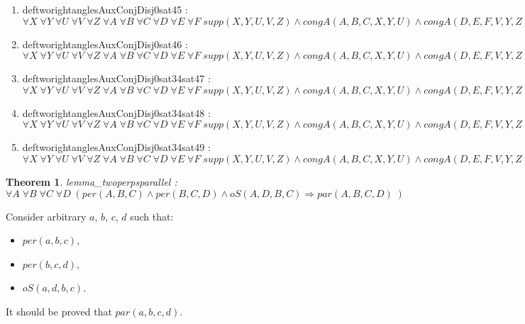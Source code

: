 \documentclass{article}
\newtheorem{theorem}{Theorem}
\begin{document}
\begin{enumerate}
\item deftworightanglesAuxConjDisj0sat45 : $\forall X\;\forall Y\;\forall U\;\forall V\;\forall Z\;\forall A\;\forall B\;\forall C\;\forall D\;\forall E\;\forall F\;supp(X, Y, U, V, Z)\wedge congA(A, B, C, X, Y, U)\wedge congA(D, E, F, V, Y, Z) \Rightarrow X \neq Y)$
\item deftworightanglesAuxConjDisj0sat46 : $\forall X\;\forall Y\;\forall U\;\forall V\;\forall Z\;\forall A\;\forall B\;\forall C\;\forall D\;\forall E\;\forall F\;supp(X, Y, U, V, Z)\wedge congA(A, B, C, X, Y, U)\wedge congA(D, E, F, V, Y, Z) \Rightarrow Y \neq Z)$
\item deftworightanglesAuxConjDisj0sat34sat47 : $\forall X\;\forall Y\;\forall U\;\forall V\;\forall Z\;\forall A\;\forall B\;\forall C\;\forall D\;\forall E\;\forall F\;supp(X, Y, U, V, Z)\wedge congA(A, B, C, X, Y, U)\wedge congA(D, E, F, V, Y, Z) \Rightarrow Z \neq X)$
\item deftworightanglesAuxConjDisj0sat34sat48 : $\forall X\;\forall Y\;\forall U\;\forall V\;\forall Z\;\forall A\;\forall B\;\forall C\;\forall D\;\forall E\;\forall F\;supp(X, Y, U, V, Z)\wedge congA(A, B, C, X, Y, U)\wedge congA(D, E, F, V, Y, Z) \Rightarrow Y \neq X)$
\item deftworightanglesAuxConjDisj0sat34sat49 : $\forall X\;\forall Y\;\forall U\;\forall V\;\forall Z\;\forall A\;\forall B\;\forall C\;\forall D\;\forall E\;\forall F\;supp(X, Y, U, V, Z)\wedge congA(A, B, C, X, Y, U)\wedge congA(D, E, F, V, Y, Z) \Rightarrow Z \neq Y)$
\end{enumerate}

\hrulefill

\begin{theorem}
lemma\_twoperpsparallel : $\forall A \; \forall B \; \forall C \; \forall D \; ( per(A, B, C)\wedge per(B, C, D)\wedge oS(A, D, B, C) \Rightarrow par(A, B, C, D)\;)$
\end{theorem}

\setcounter{proofstepnum}{0}

\vspace{5pt}

\noindent Consider arbitrary $a$, $b$, $c$, $d$ such that: \begin{itemize} 

\item  $per(a, b, c)$, 
\item  $per(b, c, d)$, 
\item  $oS(a, d, b, c)$. 
\end{itemize} 
It should be proved that $par(a, b, c, d)$.
\vspace{5pt}
\end{document}
